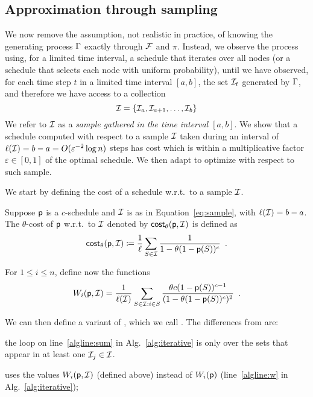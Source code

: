 \subsection{Approximation through sampling}\label{sec:sampcomp}
We now remove the assumption, not realistic in practice, of knowing the
generating process $\Gamma$ exactly through $\mathcal{F}$ and $\pi$. Instead, we
observe the process using, for a limited time interval, a schedule that iterates
over all nodes (or a schedule that selects each node with uniform probability),
until we have observed, for each time step $t$ in a limited time interval
$[a,b]$, the set $\mathcal{I}_t$ generated by $\Gamma$, and therefore we have access
to a collection
\begin{equation}\label{eq:sample}
	\mathcal{I}=\{\mathcal{I}_a,\mathcal{I}_{a+1},\dotsc,\mathcal{I}_b\}
\end{equation}
We refer to $\mathcal{I}$ as a \emph{sample gathered in the time interval
$[a,b]$}. We show that a schedule computed with respect to a sample $\mathcal{I}$ taken during an interval of
$ \ell (\mathcal{I}) = b-a=O(\varepsilon^{-2}\log n)$ steps has cost which is within  a
multiplicative factor $\varepsilon\in[0,1]$ of the optimal schedule. We then adapt \algoname to optimize with respect to such sample.


We start by defining the cost of a schedule w.r.t.~to a sample $\mathcal{I}$.

\begin{definition}\label{def:costsample}
	Suppose $\mathsf{p}$ is a $c$-schedule and $\mathcal{I}$ is as in Equation~\eqref{eq:sample},
	with $\ell (\mathcal{I}) = b-a$. The $\theta$-cost of $\mathsf{p}$ w.r.t.~to $\mathcal{I}$
	denoted by $\mathsf{cost}_\theta(\mathsf{p},\mathcal{I})$ is defined as
	\[
		\mathsf{cost}_\theta(\mathsf{p},\mathcal{I})\coloneqq\frac{1}{\ell}\sum_{S\in \mathcal{I}}
		\frac{1}{1-\theta(1-\mathsf{p}(S))^c}\enspace.
	\]
\end{definition}

For $1\le i\le n$, define now the functions
\[
	W_i(\mathsf{p},\mathcal{I}) = \frac{1}{\ell(\mathcal{I})}\sum_{S\in \mathcal{I}: i\in S}
	\frac{\theta c (1-\mathsf{p}(S))^{c-1}}{(1-\theta(1-\mathsf{p}(S))^c)^2}\enspace.
\]

We can then define a variant of \algoname, which we call \algonameapx. The
differences from \algoname are:
\begin{enumerate*}
	\item the loop on line~\ref{algline:sum} in Alg.~\ref{alg:iterative} is only
		over the sets that appear in at least one $\mathcal{I}_j\in\mathcal{I}$.
	\item \algonameapx uses the values $W_i(\mathsf{p},\mathcal{I})$ (defined above) instead of
		$W_i(\mathsf{p})$ (line~\ref{algline:w} in Alg.~\ref{alg:iterative});
\end{enumerate*}

